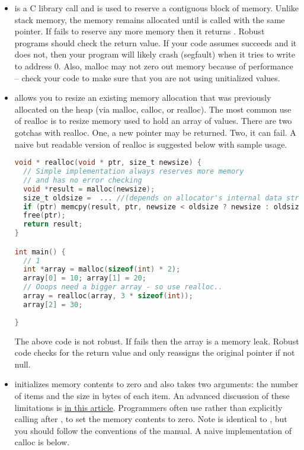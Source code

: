 \begin{itemize}
\item {} is a C library call and is used to reserve a contiguous block of memory.
Unlike stack memory, the memory remains allocated until  is called with the same pointer.
If  fails to reserve any more memory then it returns .
Robust programs should check the return value.
If your code assumes  succeeds and it does not, then your program will likely crash (segfault) when it tries to write to address 0.
Also, malloc may not zero out memory because of performance -- check your code to make sure that you are not using unitialized values.

\item {} allows you to resize an existing memory allocation that was previously allocated on the heap (via malloc, calloc, or realloc).
The most common use of realloc is to resize memory used to hold an array of values.
There are two gotchas with realloc.
One, a new pointer may be returned.
Two, it can fail.
A naive but readable version of realloc is suggested below with sample usage. 

\begin{lstlisting}[language=C]
void * realloc(void * ptr, size_t newsize) {
  // Simple implementation always reserves more memory
  // and has no error checking
  void *result = malloc(newsize); 
  size_t oldsize =  ... //(depends on allocator's internal data structure)
  if (ptr) memcpy(result, ptr, newsize < oldsize ? newsize : oldsize);
  free(ptr);
  return result;
}

int main() {
  // 1
  int *array = malloc(sizeof(int) * 2);
  array[0] = 10; array[1] = 20;
  // Ooops need a bigger array - so use realloc..
  array = realloc(array, 3 * sizeof(int));
  array[2] = 30; 
  
}
\end{lstlisting}

The above code is not robust. If  fails then the array is a memory leak.
Robust code checks for the return value and only reassigns the original pointer if not null.

\item {} initializes memory contents to zero and also takes two arguments: the number of items and the size in bytes of each item.
An advanced discussion of these limitations is \href{http://locklessinc.com/articles/calloc/}{in this article}.
Programmers often use  rather than explicitly calling  after , to set the memory contents to zero.
Note  is identical to , but you should follow the conventions of the manual.
A naive implementation of calloc is below.


\end{itemize}
